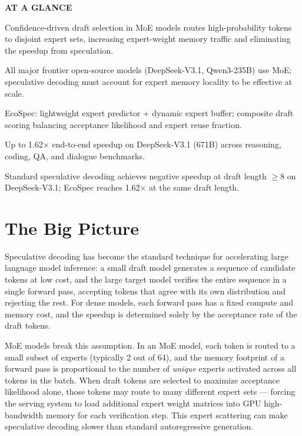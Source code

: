 \documentclass[10pt,twocolumn]{article}
\begin{document}
\begin{mdframed}[backgroundcolor=boxgray,linecolor=rulered,linewidth=1pt,
    innerleftmargin=6pt,innerrightmargin=6pt,
    innertopmargin=6pt,innerbottommargin=6pt]
\textbf{\small AT A GLANCE}\par\vspace{4pt}
\begin{description}[leftmargin=0pt,labelsep=4pt,itemsep=2pt,parsep=0pt,
    font=\small\bfseries]
  \item[Problem:] Confidence-driven draft selection in MoE models routes
    high-probability tokens to disjoint expert sets, increasing
    expert-weight memory traffic and eliminating the speedup from
    speculation.
  \item[Why it matters:] All major frontier open-source models
    (DeepSeek-V3.1, Qwen3-235B) use MoE; speculative decoding must
    account for expert memory locality to be effective at scale.
  \item[Method:] EcoSpec: lightweight expert predictor + dynamic expert
    buffer; composite draft scoring balancing acceptance likelihood
    and expert reuse fraction.
  \item[Result:] Up to 1.62$\times$ end-to-end speedup on DeepSeek-V3.1
    (671B) across reasoning, coding, QA, and dialogue benchmarks.
  \item[Evidence:] Standard speculative decoding achieves negative
    speedup at draft length $\geq$8 on DeepSeek-V3.1; EcoSpec
    reaches 1.62$\times$ at the same draft length.
\end{description}
\end{mdframed}

\section{The Big Picture}

Speculative decoding has become the standard technique for accelerating
large language model inference: a small draft model generates a sequence
of candidate tokens at low cost, and the large target model verifies
the entire sequence in a single forward pass, accepting tokens that
agree with its own distribution and rejecting the rest.
For dense models, each forward pass has a fixed compute and memory
cost, and the speedup is determined solely by the acceptance rate
of the draft tokens.

MoE models break this assumption.
In an MoE model, each token is routed to a small subset of experts
(typically 2 out of 64), and the memory footprint of a forward pass
is proportional to the number of \emph{unique} experts activated
across all tokens in the batch.
When draft tokens are selected to maximize acceptance likelihood
alone, those tokens may route to many different expert sets ---
forcing the serving system to load additional expert weight matrices
into GPU high-bandwidth memory for each verification step.
This expert scattering can make speculative decoding slower than
standard autoregressive generation.
\end{document}
